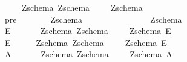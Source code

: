 \begin{isabellebody}
\ \ {\isachardoublequoteopen}{\isacharless}{\isacharequal}{\isacharplus}{\isacharequal}{\isachargreater}{\isachardoublequoteclose}\ \ \ {\isacharcolon}{\isacharcolon}\ {\isachardoublequoteopen}{\isacharbrackleft}Zschema{\isacharcomma}\ Zschema{\isacharbrackright}\ \ \ \ {\isacharequal}{\isachargreater}\ Zschema{\isachardoublequoteclose}\ {\isacharparenleft}\ {}{}{\isacharparenright}\ \isanewline
\ \ pre\ \ \ \ \ \ \ {\isacharcolon}{\isacharcolon}\ {\isachardoublequoteopen}Zschema\ \ \ \ \ \ \ \ \ \ \ \ \ \ \ {\isacharequal}{\isachargreater}\ Zschema{\isachardoublequoteclose}\isanewline
\ \ {\isachardoublequoteopen}{\isacharpercent}E{\isachardoublequoteclose}\ \ \ \ \ \ {\isacharcolon}{\isacharcolon}\ {\isachardoublequoteopen}{\isacharbrackleft}Zschema{\isacharcomma}\ Zschema{\isacharbrackright}\ \ \ \ {\isacharequal}{\isachargreater}\ Zschema{\isachardoublequoteclose}\ {\isacharparenleft}{\isachardoublequoteopen}{\isacharpercent}E\ {\isacharparenleft}{}{\isacharunderscore}{\isacharparenright}\ {\isacharat}\ {\isacharparenleft}{\isacharunderscore}{\isacharparenright}{\isachardoublequoteclose}\ \ \ \ {\isacharbrackleft}{}{}{\isacharcomma}{}{}{\isacharbrackright}{}{}{\isacharparenright}\isanewline
\ \ {\isachardoublequoteopen}{\isacharpercent}E{}{\isachardoublequoteclose}\ \ \ \ \ {\isacharcolon}{\isacharcolon}\ {\isachardoublequoteopen}{\isacharbrackleft}Zschema{\isacharcomma}\ Zschema{\isacharbrackright}\ \ \ \ {\isacharequal}{\isachargreater}\ Zschema{\isachardoublequoteclose}\ {\isacharparenleft}{\isachardoublequoteopen}{\isacharpercent}E{}\ {\isacharparenleft}{}{\isacharunderscore}{\isacharparenright}\ {\isacharat}\ {\isacharparenleft}{\isacharunderscore}{\isacharparenright}{\isachardoublequoteclose}\ \ \ {\isacharbrackleft}{}{}{\isacharcomma}{}{}{\isacharbrackright}{}{}{\isacharparenright}\isanewline
\ \ {\isachardoublequoteopen}{\isacharpercent}A{\isachardoublequoteclose}\ \ \ \ \ \ {\isacharcolon}{\isacharcolon}\ {\isachardoublequoteopen}{\isacharbrackleft}Zschema{\isacharcomma}\ Zschema{\isacharbrackright}\ \ \ \ {\isacharequal}{\isachargreater}\ Zschema{\isachardoublequoteclose}\ {\isacharparenleft}{\isachardoublequoteopen}{\isacharpercent}A\ {\isacharparenleft}{}{\isacharunderscore}{\isacharparenright}\ {\isacharat}\ {\isacharparenleft}{\isacharunderscore}{\isacharparenright}{\isachardoublequoteclose}\ \ \ \ {\isacharbrackleft}{}{}{\isacharcomma}{}{}{\isacharbrackright}{}{}{\isacharparenright}\isanewline

\end{isabellebody}
